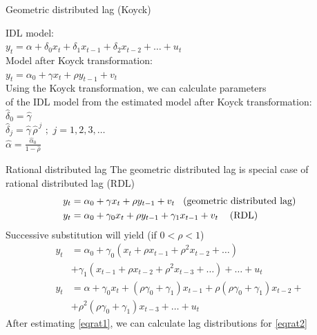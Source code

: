 \documentclass{beamer}
\begin{document}
\begin{frame}{Geometric distributed lag (Koyck) }

IDL model:\\
\medskip
$ y_t = \alpha + \delta_0 x_t  + \delta_1 x_{t-1} + \delta_2 x_{t-2} + \dots + u_t $\\
\medskip
Model after Koyck transformation:\\
\medskip
$y_t = \alpha_0 + \gamma x_t + \rho y_{t-1} + v_t$ \\
\medskip
Using the Koyck transformation, we can calculate parameters \\of the IDL model from the estimated model after Koyck transformation:\\
\medskip
$\hat{\delta}_0 = \hat{\gamma}$ \\
\medskip
$\hat{\delta}_j = \hat{\gamma} \, \hat{\rho}^{\,j} \,\, ; \,\, j = 1,2,3, \dots$ \\
\medskip
$\hat{\alpha} = \frac{\hat{\alpha}_0}{1-\hat{\rho}}$

\end{frame}

\begin{frame}{Rational distributed lag}
The geometric distributed lag is special case of \\rational distributed lag (RDL)
\begin{align} \nonumber
y_t & = \alpha_0+\gamma x_t + \rho y_{t-1} + v_t \hspace{0.3cm} \textnormal{(geometric distributed lag)}\\\label{eqrat1} 
y_t & = \alpha_0+\gamma_0 x_t + \rho y_{t-1} +\gamma_1 x_{t-1} + v_t  \hspace{0.3cm} \textnormal{ (RDL)}
\end{align}
Successive substitution will yield (if $0 < \rho < 1$)
\begin{align}\nonumber
y_t & = \alpha_0 + \gamma_0 (x_t + \rho x_{t-1} + \rho^2 x_{t-2}+\dots) \\ & + \gamma_1 (x_{t-1} + \rho x_{t-2} + \rho^2 x_{t-3}+\dots) + \dots + u_t \\ \nonumber
y_t & = \alpha + \gamma_0 x_t + (\rho \gamma_0 + \gamma_1) x_{t-1} + \rho (\rho \gamma_0 + \gamma_1) x_{t-2} +\\ & + \rho^2 (\rho \gamma_0 + \gamma_1) x_{t-3} + \dots + u_t \label{eqrat2}
\end{align}
After estimating \eqref{eqrat1}, we can calculate lag distributions for \eqref{eqrat2}

\end{frame}
\end{document}

